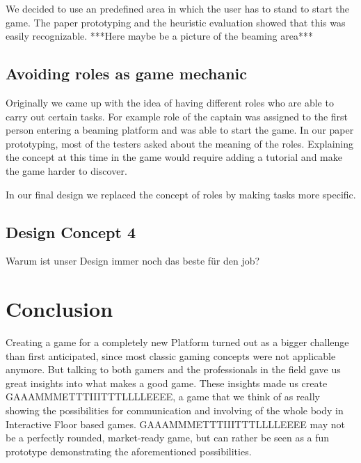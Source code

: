 \documentclass{sigchi}
\begin{document}
We decided to use an predefined area in which the user has to stand to start the game. The paper prototyping and the heuristic evaluation showed that this was easily recognizable. 
***Here maybe be a picture of the beaming area*** 


\subsection{Avoiding roles as game mechanic}
\vspace{1mm}
Originally we came up with the idea of having different roles who are able to carry out certain tasks. For example role of the captain was assigned to the first person entering a beaming platform and was able to start the game. In our paper prototyping, most of the testers asked about the meaning of the roles. Explaining the concept at this time in the game would require adding a tutorial and make the game harder to discover. 

In our final design we replaced the concept of roles by making tasks more specific.   

\subsection{Design Concept 4}
\vspace{1mm}
Warum ist unser Design immer noch das beste für den job?



\section{Conclusion}
\vspace{1mm}
Creating a game for a completely new Platform turned out as a bigger challenge than first anticipated, since most classic gaming concepts were not applicable anymore. But talking to both gamers and the professionals in the field gave us great insights into what makes a good game. These insights made us create GAAAMMMETTTIIITTTLLLLEEEE, a game that we think of as really showing the possibilities for communication and involving of the whole body in Interactive Floor based games. \newline
GAAAMMMETTTIIITTTLLLLEEEE may not be a perfectly rounded, market-ready game, but can rather be seen as a fun prototype demonstrating the aforementioned possibilities.


\balance
\end{document}
